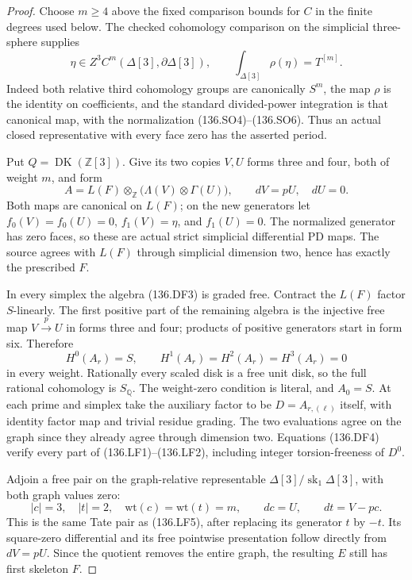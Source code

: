 \begin{proof}
Choose \(m\geq4\) above the fixed comparison bounds for
\(C\) in the finite degrees used below.  The checked
cohomology comparison on the simplicial three-sphere supplies
\[
 \eta\in Z^3 C^m(\Delta[3],\partial\Delta[3]),
 \qquad
                 \int_{\Delta[3]}\rho(\eta)=T^{[m]}.
                                                               \tag{136.DF2}
\]
Indeed both relative third cohomology groups are canonically
\(S^m\), the map \(\rho\) is the identity on coefficients,
and the standard divided-power integration is that canonical
map, with the normalization (136.SO4)--(136.SO6).
Thus an actual closed representative with every face zero
has the asserted period.

Put \(Q=\operatorname{DK}(\mathbb Z[3])\).  Give its
two copies \(V,U\) forms three and four, both of weight
\(m\), and form
\[
 A=L(F)\otimes_{\mathbb Z}
           \bigl(\Lambda(V)\otimes\Gamma(U)\bigr),
                     \qquad dV=pU,\quad dU=0.
                                                               \tag{136.DF3}
\]
Both maps are canonical on \(L(F)\); on the new generators
let \(f_0(V)=f_0(U)=0\), \(f_1(V)=\eta\),
and \(f_1(U)=0\).  The normalized generator has zero
faces, so these are actual strict simplicial differential PD
maps.  The source agrees with \(L(F)\) through simplicial
dimension two, hence has exactly the prescribed \(F\).

In every simplex the algebra (136.DF3) is graded free.
Contract the \(L(F)\) factor \(S\)-linearly.  The first
positive part of the remaining algebra is the injective free
map \(V\xrightarrow{p}U\) in forms three and four;
products of positive generators start in form six.  Therefore
\[
                   H^0(A_r)=S,\qquad
                   H^1(A_r)=H^2(A_r)=H^3(A_r)=0
                                                               \tag{136.DF4}
\]
in every weight.  Rationally every scaled disk is a free unit
disk, so the full rational cohomology is \(S_{\mathbb Q}\).
The weight-zero condition is literal, and \(A_0=S\).
At each prime and simplex take the auxiliary factor to be
\(D=A_{r,(\ell)}\) itself, with identity factor map and
trivial residue grading.  The two evaluations agree on the
graph since they already agree through dimension two.
Equations (136.DF4) verify every part of (136.LF1)--(136.LF2),
including integer torsion-freeness of \(D^0\).

Adjoin a free pair on the graph-relative representable
\(\Delta[3]/\operatorname{sk}_1\Delta[3]\), with both
graph values zero:
\[
              |c|=3,\quad |t|=2,\quad
              \mathrm{wt}(c)=\mathrm{wt}(t)=m,
              \qquad dc=U,\qquad dt=V-pc.
                                                               \tag{136.DF5}
\]
This is the same Tate pair as (136.LF5), after replacing
its generator \(t\) by \(-t\).  Its square-zero differential
and its free pointwise presentation follow directly from
\(dV=pU\).  Since the quotient removes the entire graph,
the resulting \(E\) still has first skeleton \(F\).


\end{proof}
